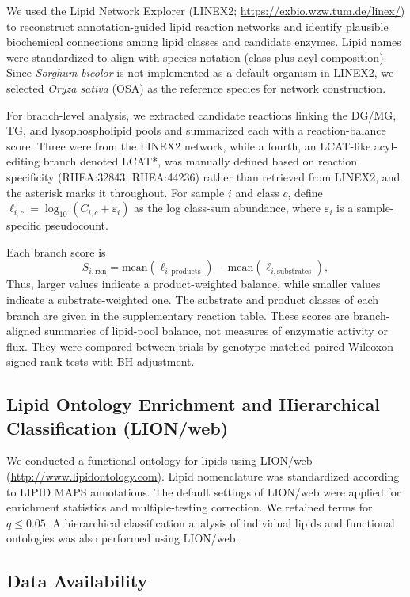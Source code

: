 \documentclass[9pt,twocolumn,twoside]{rilabRxiv}
\begin{document}
We used the Lipid Network Explorer (LINEX2; \url{https://exbio.wzw.tum.de/linex/}) to reconstruct annotation-guided lipid reaction networks and identify plausible biochemical connections among lipid classes and candidate enzymes. Lipid names were standardized to align with species notation (class plus acyl composition). Since \textit{Sorghum bicolor} is not implemented as a default organism in LINEX2, we selected \textit{Oryza sativa} (OSA) as the reference species for network construction.

For branch-level analysis, we extracted candidate reactions linking the DG/MG, TG, and lysophospholipid pools and summarized each with a reaction-balance score. Three were from the LINEX2 network, while a fourth, an LCAT-like acyl-editing branch denoted LCAT*, was manually defined based on reaction specificity (RHEA:32843, RHEA:44236) rather than retrieved from LINEX2, and the asterisk marks it throughout. For sample $i$ and class $c$, define $\ell_{i,c}=\log_{10}(C_{i,c}+\varepsilon_i)$ as the log class-sum abundance, where $\varepsilon_i$ is a sample-specific pseudocount.

Each branch score is
\[
S_{i,\mathrm{rxn}}=\mathrm{mean}(\ell_{i,\mathrm{products}})-\mathrm{mean}(\ell_{i,\mathrm{substrates}}),
\]
Thus, larger values indicate a product-weighted balance, while smaller values indicate a substrate-weighted one. The substrate and product classes of each branch are given in the supplementary reaction table. These scores are branch-aligned summaries of lipid-pool balance, not measures of enzymatic activity or flux. They were compared between trials by genotype-matched paired Wilcoxon signed-rank tests with BH adjustment.

\subsection*{Lipid Ontology Enrichment and Hierarchical Classification (LION/web)}

We conducted a functional ontology for lipids using LION/web \citep{Molenaar2019} (\url{http://www.lipidontology.com}). Lipid nomenclature was standardized according to LIPID MAPS annotations. The default settings of LION/web were applied for enrichment statistics and multiple-testing correction. We retained terms for $q \leq 0.05$. A hierarchical classification analysis of individual lipids and functional ontologies was also performed using LION/web.

\subsection*{Data Availability}
\end{document}
